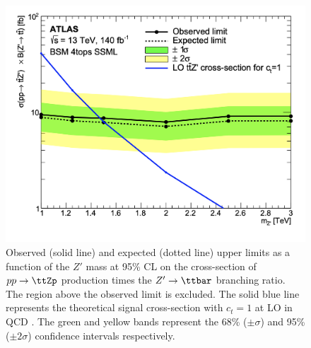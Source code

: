 \documentclass[../thesis.tex]{subfiles}
\begin{document}
\begin{figure}[!htb]
\centering
\includegraphics[width=0.7\linewidth]{fig/SRunblinded/ttZp_limits_fb.png}
\caption[Observed (solid line) and expected (dotted line) upper limits as a function of the $Z'$ mass at 95\% \acs{CL} on the cross-section of $pp\rightarrow\ttZp$ production times the $Z'\rightarrow\ttbar$ branching ratio. The region above the observed limit is excluded. The solid blue line represents the theoretical signal cross-section with $c_t=1$ at \acs{LO} in \acs{QCD}. The green and yellow bands represent the 68\% ($\pm\sigma$) and 95\% ($\pm 2\sigma$) confidence intervals respectively.]{\label{fig:results:ttZp_limits}Observed (solid line) and expected (dotted line) upper limits as a function of the $Z'$ mass at 95\% \acs{CL} on the cross-section of $pp\rightarrow\ttZp$ production times the $Z'\rightarrow\ttbar$ branching ratio. The region above the observed limit is excluded. The solid blue line represents the theoretical signal cross-section with $c_t=1$ at \acs{LO} in \acs{QCD} \citep{theory:ttZp_LHC}. The green and yellow bands represent the 68\% ($\pm\sigma$) and 95\% ($\pm 2\sigma$) confidence intervals respectively.}
\end{figure}
\end{document}
